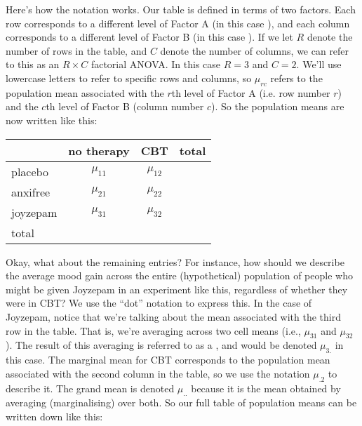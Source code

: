 Here's how the notation works. Our table is defined in terms of two factors. Each row corresponds to a different level of Factor A (in this case ), and each column corresponds to a different level of Factor B (in this case ). If we let $R$ denote the number of rows in the table, and $C$ denote the number of columns, we can refer to this as an $R \times C$ factorial ANOVA. In this case $R=3$ and $C=2$. We'll use lowercase letters to refer to specific rows and columns, so $\mu_{rc}$ refers to the population mean associated with the $r$th level of Factor A (i.e. row number $r$) and the $c$th level of Factor B (column number $c$). So the population means are now written like this:
\begin{center}
\begin{tabular}{l|cc|c}
& no therapy & CBT & total \\ \hline
placebo & $\mu_{11}$ & $\mu_{12}$ &  \\
anxifree & $\mu_{21}$ & $\mu_{22}$ &  \\
joyzepam & $\mu_{31}$ &$\mu_{32}$ &  \\ \hline
total &  &  & 
\end{tabular}
\end{center}
Okay, what about the remaining entries? For instance, how should we describe the average mood gain across the entire (hypothetical) population of people who might be given Joyzepam in an experiment like this, regardless of whether they were in CBT? We use the ``dot'' notation to express this. In the case of Joyzepam, notice that we're talking about the mean associated with the third row in the table. That is, we're averaging across two cell means (i.e., $\mu_{31}$ and $\mu_{32}$). The result of this averaging is referred to as a , and would be denoted $\mu_{3.}$ in this case. The marginal mean for CBT corresponds to the population mean associated with the second column in the table, so we use the notation $\mu_{.2}$ to describe it. The grand mean is denoted $\mu_{..}$ because it is the mean obtained by averaging (marginalising) over both. So our full table of population means can be written down like this:

